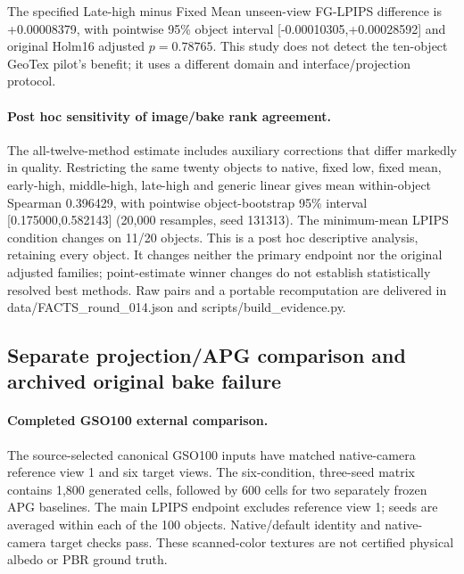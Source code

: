 \documentclass[11pt]{article}
\begin{document}
The specified Late-high minus Fixed Mean unseen-view FG-LPIPS difference is +0.00008379, with pointwise 95\% object interval [-0.00010305,+0.00028592] and original Holm16 adjusted $p=0.78765$. This study does not detect the ten-object GeoTex pilot's benefit; it uses a different domain and interface/projection protocol.

\paragraph{Post hoc sensitivity of image/bake rank agreement.}
The all-twelve-method estimate includes auxiliary corrections that differ markedly in quality. Restricting the same twenty objects to native, fixed low, fixed mean, early-high, middle-high, late-high and generic linear gives mean within-object Spearman 0.396429, with pointwise object-bootstrap 95\% interval [0.175000,0.582143] (20,000 resamples, seed 131313). The minimum-mean LPIPS condition changes on 11/20 objects. This is a post hoc descriptive analysis, retaining every object. It changes neither the primary endpoint nor the original adjusted families; point-estimate winner changes do not establish statistically resolved best methods. Raw pairs and a portable recomputation are delivered in data/FACTS\_round\_014.json and scripts/build\_evidence.py.

\subsection*{Separate projection/APG comparison and archived original bake failure}
\paragraph{Completed GSO100 external comparison.}
The source-selected canonical GSO100 inputs have matched native-camera reference view 1 and six target views. The six-condition, three-seed matrix contains 1,800 generated cells, followed by 600 cells for two separately frozen APG baselines. The main LPIPS endpoint excludes reference view 1; seeds are averaged within each of the 100 objects. Native/default identity and native-camera target checks pass. These scanned-color textures are not certified physical albedo or PBR ground truth.
\end{document}

